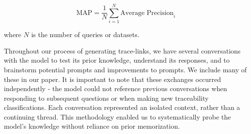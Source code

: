 \begin{equation*}
\text{MAP} = \frac{1}{N} \sum_{i=1}^{N} \text{Average Precision}_i
\end{equation*}

where $N$ is the number of queries or datasets.

Throughout our process of generating trace-links, we have several conversations with the model to test its prior knowledge, understand its responses, and to brainstorm potential prompts and improvements to prompts. We include many of these in our paper. It is important to note that these exchanges occurred independently - the model could not reference previous conversations when responding to subsequent questions or when making new traceability classifications. Each conversation represented an isolated context, rather than a continuing thread. This methodology enabled us to systematically probe the model's knowledge without reliance on prior memorization.


